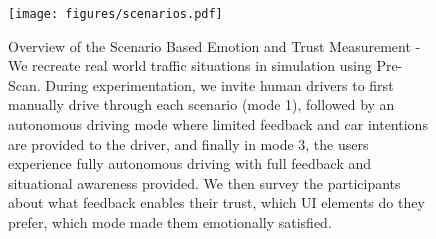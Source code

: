 \begin{figure}
    \centering
    \texttt{[image: figures/scenarios.pdf]}
    \caption{Overview of the Scenario Based Emotion and Trust Measurement - We recreate real world traffic situations in simulation using Pre-Scan. During experimentation, we invite human drivers to first manually drive through each scenario (mode 1), followed by an autonomous driving mode where limited feedback and car intentions are provided to the driver, and finally in mode 3, the users experience fully autonomous driving with full feedback and situational awareness provided. We then survey the participants about what feedback enables their trust, which UI elements do they prefer, which mode made them emotionally satisfied.  }
    \label{fig:scenario}
\end{figure}